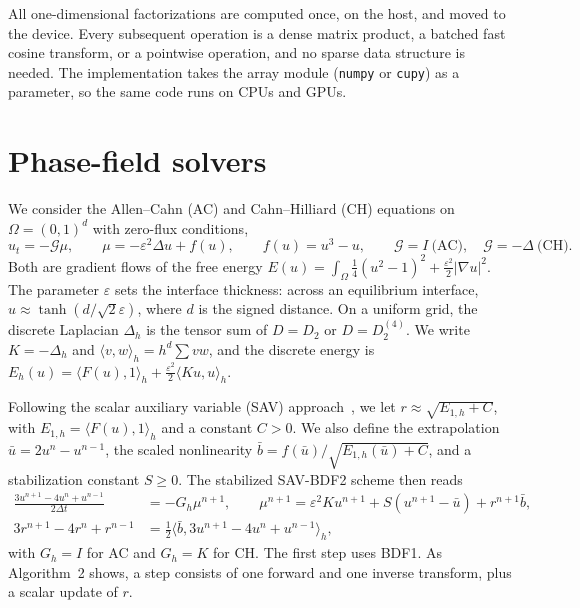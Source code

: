 \documentclass[preprint,12pt]{elsarticle}
\theoremstyle{remark}
\begin{document}
All one-dimensional factorizations are computed once, on the host, and moved to the device. Every
subsequent operation is a dense matrix product, a batched fast cosine transform, or a pointwise
operation, and no sparse data structure is needed. The implementation takes the array module
(\texttt{numpy} or \texttt{cupy}) as a parameter, so the same code runs on CPUs and GPUs.

\section{Phase-field solvers}\label{sec:pf}
We consider the Allen--Cahn (AC) and Cahn--Hilliard (CH) equations on $\Omega=(0,1)^d$ with zero-flux
conditions,
\begin{equation}
u_t=-\mathcal G\mu,\qquad \mu=-\varepsilon^2\Delta u+f(u),\qquad f(u)=u^3-u,\qquad
\mathcal G=I\ \text{(AC)},\quad \mathcal G=-\Delta\ \text{(CH)}.
\end{equation}
Both are gradient flows of the free energy
$E(u)=\int_\Omega\tfrac14(u^2-1)^2+\tfrac{\varepsilon^2}{2}|\nabla u|^2$. The parameter $\varepsilon$
sets the interface thickness: across an equilibrium interface, $u\approx\tanh(d/\sqrt2\varepsilon)$,
where $d$ is the signed distance. On a uniform grid, the discrete Laplacian $\Delta_h$ is the tensor sum
of $D=D_2$ or $D=D_2^{(4)}$. We write $K=-\Delta_h$ and $\langle v,w\rangle_h=h^d\sum vw$, and the
discrete energy is $E_h(u)=\langle F(u),1\rangle_h+\tfrac{\varepsilon^2}{2}\langle Ku,u\rangle_h$.

Following the scalar auxiliary variable (SAV) approach~\cite{shen2018scalar}, we let
$r\approx\sqrt{E_{1,h}+C}$, with $E_{1,h}=\langle F(u),1\rangle_h$ and a constant $C>0$. We also define
the extrapolation $\bar u=2u^n-u^{n-1}$, the scaled nonlinearity
$\bar b=f(\bar u)/\sqrt{E_{1,h}(\bar u)+C}$, and a stabilization constant $S\ge0$. The stabilized
SAV-BDF2 scheme then reads
\begin{align}
\frac{3u^{n+1}-4u^n+u^{n-1}}{2\Delta t}&=-G_h\mu^{n+1},\qquad
\mu^{n+1}=\varepsilon^2Ku^{n+1}+S(u^{n+1}-\bar u)+r^{n+1}\bar b,\label{eq:sav1}\\
3r^{n+1}-4r^n+r^{n-1}&=\tfrac12\langle\bar b,3u^{n+1}-4u^n+u^{n-1}\rangle_h,\label{eq:sav2}
\end{align}
with $G_h=I$ for AC and $G_h=K$ for CH. The first step uses BDF1. As Algorithm~2 shows, a step consists
of one forward and one inverse transform, plus a scalar update of $r$.
\end{document}
